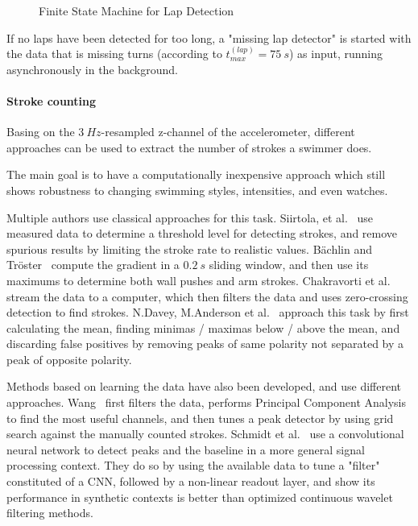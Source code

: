 \documentclass[a4paper, oneside]{discothesis}
\begin{document}
\begin{figure}[H]
  \centering
  
  \caption{Finite State Machine for Lap Detection}
    \label{fig:lapfsm}
\end{figure}

If no laps have been detected for too long, a "missing lap detector" is started with the data that is missing turns (according to $t_{max}^{(lap)}=75~s$) as input, running asynchronously in the background.



\paragraph{Stroke counting} Basing on the $3~Hz$-resampled z-channel of the accelerometer, different approaches can be used to extract the number of strokes a swimmer does. 

The main goal is to have a computationally inexpensive approach which still shows robustness to changing swimming styles, intensities, and even watches.

Multiple authors use classical approaches for this task. Siirtola, et al.~\cite{SLR11} use measured data to determine a threshold level for detecting strokes, and remove spurious results by limiting the stroke rate to realistic values. Bächlin and Tröster~\cite{BG11} compute the gradient in a $0.2~s$ sliding window, and then use its maximums to determine both wall pushes and arm strokes. Chakravorti et al.~\cite{CSSC13} stream the data to a computer, which then filters the data and uses zero-crossing detection to find strokes. N.Davey, M.Anderson et al.~\cite{DAJ08} approach this task by first calculating the mean, finding minimas / maximas below / above the mean, and discarding false positives by removing peaks of same polarity not separated by a peak of opposite polarity.

Methods based on learning the data have also been developed, and use different approaches. Wang~\cite{WANG19} first filters the data, performs Principal Component Analysis to find the most useful channels, and then tunes a peak detector by using grid search against the manually counted strokes. Schmidt et al.~\cite{SASL19} use a convolutional neural network to detect peaks and the baseline in a more general signal processing context. They do so by using the available data to tune a "filter" constituted of a CNN, followed by a non-linear readout layer, and show its performance in synthetic contexts is better than optimized continuous wavelet filtering methods.
\end{document}
